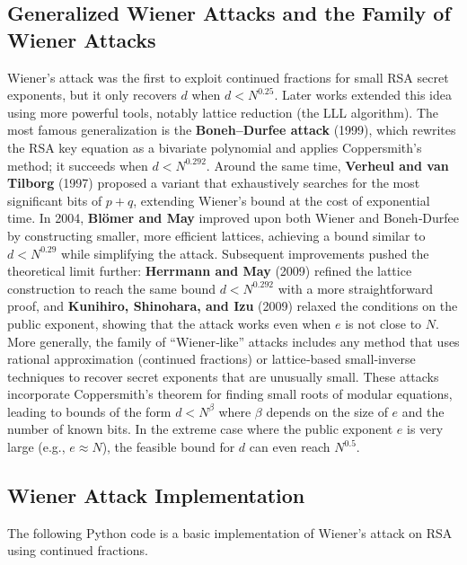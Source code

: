 \subsection{ Generalized Wiener Attacks and the Family of Wiener Attacks}

Wiener’s attack was the first to exploit continued fractions for small RSA secret exponents, but it only recovers \(d\) when \(d < N^{0.25}\). Later works extended this idea using more powerful tools, notably lattice reduction (the LLL algorithm). The most famous generalization is the \textbf{Boneh–Durfee attack} (1999), which rewrites the RSA key equation as a bivariate polynomial and applies Coppersmith’s method; it succeeds when \(d < N^{0.292}\). Around the same time, \textbf{Verheul and van Tilborg} (1997) proposed a variant that exhaustively searches for the most significant bits of \(p+q\), extending Wiener’s bound at the cost of exponential time. In 2004, \textbf{Bl\"omer and May} improved upon both Wiener and Boneh‑Durfee by constructing smaller, more efficient lattices, achieving a bound similar to \(d < N^{0.29}\) while simplifying the attack. Subsequent improvements pushed the theoretical limit further: \textbf{Herrmann and May} (2009) refined the lattice construction to reach the same bound \(d < N^{0.292}\) with a more straightforward proof, and \textbf{Kunihiro, Shinohara, and Izu} (2009) relaxed the conditions on the public exponent, showing that the attack works even when \(e\) is not close to \(N\). More generally, the family of “Wiener‑like” attacks includes any method that uses rational approximation (continued fractions) or lattice‑based small‑inverse techniques to recover secret exponents that are unusually small. These attacks incorporate Coppersmith’s theorem for finding small roots of modular equations, leading to bounds of the form \(d < N^{\beta}\) where \(\beta\) depends on the size of \(e\) and the number of known bits. In the extreme case where the public exponent \(e\) is very large (e.g., \(e \approx N\)), the feasible bound for \(d\) can even reach \(N^{0.5}\). 



\subsection{Wiener Attack Implementation}
The following Python code is a basic implementation of Wiener's attack on RSA using continued fractions.

